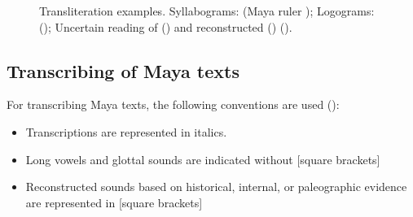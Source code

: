 \documentclass[../main.tex]{subfiles}
\begin{document}
\begin{figure}[ht]
    \centering
    \caption[Transliteration examples]{Transliteration examples.
             Syllabograms: 
            (Maya ruler );
             Logograms: 
             ();
             Uncertain reading of 
             () and reconstructed  ()
            (\authordrawings).}
\end{figure}

\subsection{Transcribing of Maya texts}
For transcribing Maya texts, the following conventions are used (\cite[14]{kettunenhelmke2020}):
\begin{itemize}
    \item Transcriptions are represented in italics.
    \item Long vowels and glottal sounds are indicated without [square brackets]
    \item Reconstructed sounds based on historical, internal, or paleographic evidence are 
          represented in [square brackets]
\end{itemize}
\end{document}

